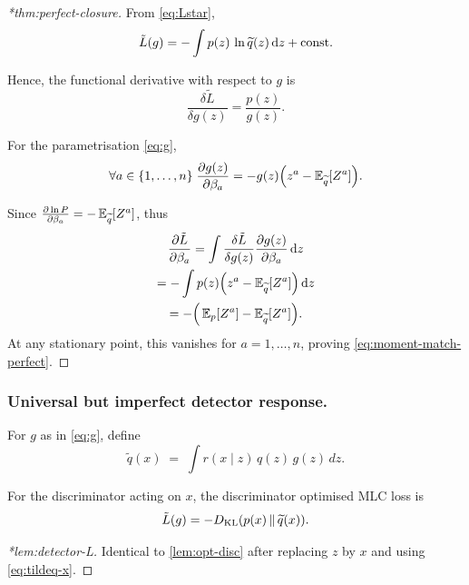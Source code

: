 \begin{proof}[*thm:perfect-closure]
From \cref{eq:Lstar},
\[
    \tilde L(g) = -\int p(z)\,\ln\widetilde{q}(z)\,\dd z + \mathrm{const}.
\]

    Hence, the functional derivative with respect to $g$ is
    \begin{equation}\label{eq:dLdgbasic}
        \frac{\delta \tilde L}{\delta g(z)} =\frac{p(z)}{g(z)}.
    \end{equation}
    
For the parametrisation \cref{eq:g},
\begin{equation}\label{eq:dgdBeta}
    \forall a\in \{1,\dots, n\}\;\frac{\partial g(z)}{\partial \beta_a} = -g(z)\qty(z^a - \operatorname{\mathbb{E}}_{\widetilde{q}}[Z^a]).
\end{equation}

Since $\pdv{\ln P}{\beta_a} = -\operatorname{\mathbb{E}}_{\widetilde{q}}[Z^a]$, thus
\begin{gather}
    \frac{\partial \tilde L}{\partial \beta_a}
= \int \frac{\delta \tilde L}{\delta g(z)}\frac{\partial g(z)}{\partial \beta_a}\,\dd z\\
= -\int p(z)\Big(z^a - \operatorname{\mathbb{E}}_{\widetilde{q}}[Z^a]\Big)\,\dd z\\
= -\Big(\operatorname{\mathbb{E}}_{p}[Z^a]-\operatorname{\mathbb{E}}_{\widetilde{q}}[Z^a]\Big).
\end{gather}
At any stationary point, this vanishes for $a=1,\dots,n$, proving \cref{eq:moment-match-perfect}.
\end{proof}

\subsubsection{Universal but imperfect detector response.}

For $g$ as in \cref{eq:g}, define
\begin{equation}\label{eq:tildeq-x}
    \tilde q(x)\;=\;\int r(x\mid z)\,q(z)\,g(z)\,dz.
\end{equation}

\begin{theorem}\label{lem:detector-L}
For the discriminator acting on $x$, the discriminator optimised MLC loss is
\begin{equation}\label{eq:Lstar-det}
    \tilde L(g) = - D_{\mathrm{KL}} \qty(p(x)\,\|\,\widetilde{q}(x)).
\end{equation}
\end{theorem}

\begin{proof}[*lem:detector-L]
Identical to \cref{lem:opt-disc} after replacing $z$ by $x$ and using \cref{eq:tildeq-x}.
\end{proof}

